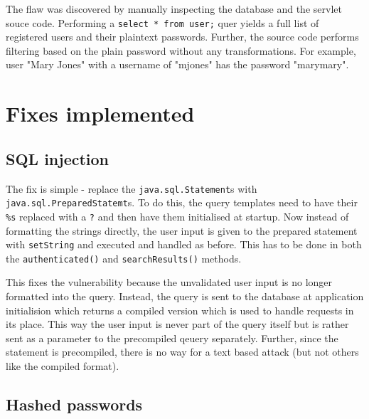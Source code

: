 \documentclass[10pt]{article}
\begin{document}
            The flaw was discovered by manually inspecting the database and the
            servlet souce code. Performing a \texttt{select * from user;} quer
            yields a full list of registered users and their plaintext
            passwords. Further, the source code performs filtering based on the
            plain password without any transformations. For example, user "Mary
            Jones" with a username of "mjones" has the password "marymary".


    \section{Fixes implemented}

        \subsection{SQL injection}

            The fix is simple - replace the \texttt{java.sql.Statement}s with
            \texttt{java.sql.PreparedStatemt}s. To do this, the query templates
            need to have their \texttt{\%s} replaced with a \texttt{?} and then
            have them initialised at startup. Now instead of formatting the
            strings directly, the user input is given to the prepared statement
            with \texttt{setString} and executed and handled as before. This
            has to be done in both the \texttt{authenticated()} and
            \texttt{searchResults()} methods.

            This fixes the vulnerability because the unvalidated user input is
            no longer formatted into the query. Instead, the query is sent to
            the database at application initialision which returns a compiled
            version which is used to handle requests in its place. This way the
            user input is never part of the query itself but is rather sent as
            a parameter to the precompiled qeuery separately. Further, since
            the statement is precompiled, there is no way for a text based
            attack (but not others like the compiled format).


        \subsection{Hashed passwords}
\end{document}
